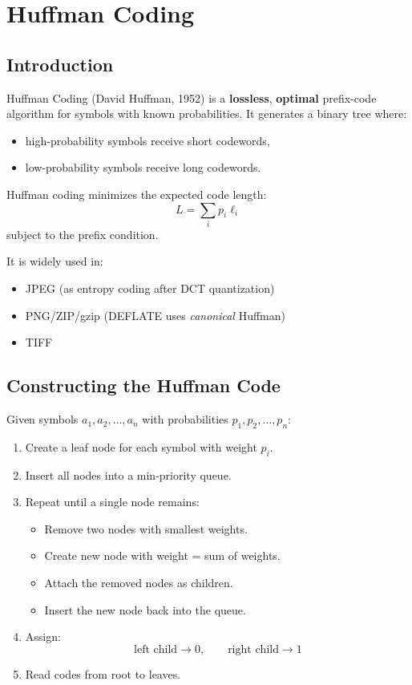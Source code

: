 \documentclass{AnantDocumentation}
\begin{document}
\section{Huffman Coding}

\subsection{Introduction}

Huffman Coding (David Huffman, 1952) is a \textbf{lossless}, \textbf{optimal} prefix-code algorithm for symbols with known probabilities.  
It generates a binary tree where:

\begin{itemize}
\item high-probability symbols receive short codewords,
\item low-probability symbols receive long codewords.
\end{itemize}

Huffman coding minimizes the expected code length:
\[
L = \sum_{i} p_i \ell_i
\]
subject to the prefix condition.

It is widely used in:

\begin{itemize}
\item JPEG (as entropy coding after DCT quantization)
\item PNG/ZIP/gzip (DEFLATE uses \textit{canonical} Huffman)
\item TIFF
\end{itemize}

\subsection{Constructing the Huffman Code}

Given symbols \(a_1, a_2, \ldots, a_n\) with probabilities \(p_1, p_2, \ldots, p_n\):

\begin{enumerate}
\item Create a leaf node for each symbol with weight \(p_i\).
\item Insert all nodes into a min-priority queue.
\item Repeat until a single node remains:
	\begin{itemize}
	\item Remove two nodes with smallest weights.
	\item Create new node with weight = sum of weights.
	\item Attach the removed nodes as children.
	\item Insert the new node back into the queue.
	\end{itemize}
\item Assign:
	\[
	\text{left child} \rightarrow 0,\qquad \text{right child} \rightarrow 1
	\]
\item Read codes from root to leaves.
\end{enumerate}
\end{document}
